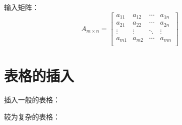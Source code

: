 输入矩阵：
\begin{equation}
	\label{eqn:matrix}
	A_{m\times n}=
	\left[ {\begin{array}{cccc}
			a_{11} & a_{12} & \cdots & a_{1n}\\
			a_{21} & a_{22} & \cdots & a_{2n}\\
			\vdots & \vdots & \ddots & \vdots\\
			a_{m1} & a_{m2} & \cdots & a_{mn}\\
	\end{array}}\right]
\end{equation}

\section{表格的插入}
\label{sec:table}
插入一般的表格：


较为复杂的表格：
